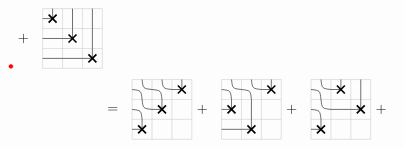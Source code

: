 \begin{align*}
\begin{tikzpicture}[scale=0.5]
                    \node[circle, fill=red, draw=red, scale=0.3] at (0.5,1.5) {};
    \end{tikzpicture}
        \begin{tikzpicture}[scale=0.5]
        \draw[white!20] (0,0) grid (1,3);
        \node[text width=0.5cm] at (0.5, 1.5) {$+$};
        \end{tikzpicture}
    \begin{tikzpicture}[scale=0.5]
        \draw[black!20] (0,0) grid (3,3);
        \Xmarking{1}{3}\Xmarking{2}{2}\Xmarking{3}{1}
        \UP{2}{3}\EAST{1}{2}\UP{3}{2}\UP{3}{3}\EAST{1}{1}\EAST{2}{1}
    \end{tikzpicture}\\
    &\begin{tikzpicture}[scale=0.5]
        \draw[white!20] (0,0) grid (1,3);
        \node[text width=0.5cm] at (0.5, 1.5) {$=$};
        \end{tikzpicture}    \begin{tikzpicture}[scale=0.5]
        \draw[black!20] (0,0) grid (3,3);
        \Xmarking{1}{1}\Xmarking{2}{2}\Xmarking{3}{3}
        \Asmooth{1}{2}\Asmooth{1}{3}\Asmooth{2}{3}
    \end{tikzpicture}
        \begin{tikzpicture}[scale=0.5]
        \draw[white!20] (0,0) grid (1,3);
        \node[text width=0.5cm] at (0.5, 1.5) {$+$};
        \end{tikzpicture}
    \begin{tikzpicture}[scale=0.5]
        \draw[black!20] (0,0) grid (3,3);
        \Xmarking{1}{2}\Xmarking{2}{1}\Xmarking{3}{3}
        \Asmooth{1}{3}\Asmooth{2}{3}
        \EAST{1}{1}\UP{2}{2}
    \end{tikzpicture}
        \begin{tikzpicture}[scale=0.5]
        \draw[white!20] (0,0) grid (1,3);
        \node[text width=0.5cm] at (0.5, 1.5) {$+$};
        \end{tikzpicture}
    \begin{tikzpicture}[scale=0.5]
        \draw[black!20] (0,0) grid (3,3);
        \Xmarking{1}{1}\Xmarking{2}{3}\Xmarking{3}{2}
        \Asmooth{1}{2}\Asmooth{1}{3}\EAST{2}{2}\UP{3}{3}
    \end{tikzpicture}
        \begin{tikzpicture}[scale=0.5]
        \draw[white!20] (0,0) grid (1,3);
        \node[text width=0.5cm] at (0.5, 1.5) {$+$};
        \end{tikzpicture}
    \begin{tikzpicture}[scale=0.5]

\end{tikzpicture}
\end{align*}
